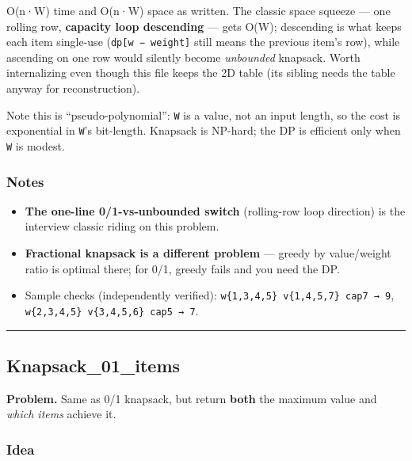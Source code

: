 \documentclass[
  10pt,
  letterpaper,
  onecolumn]{article}
\providecommand{\tightlist}{%
  \setlength{\itemsep}{0pt}\setlength{\parskip}{0pt}}
\begin{document}
O(n·W) time and O(n·W) space as written. The classic space squeeze ---
one rolling row, \textbf{capacity loop descending} --- gets O(W);
descending is what keeps each item single-use
(\texttt{dp{[}w\ −\ weight{]}} still means the previous item's row),
while ascending on one row would silently become \emph{unbounded}
knapsack. Worth internalizing even though this file keeps the 2D table
(its sibling needs the table anyway for reconstruction).

Note this is ``pseudo-polynomial'': \texttt{W} is a value, not an input
length, so the cost is exponential in \texttt{W}'s bit-length. Knapsack
is NP-hard; the DP is efficient only when \texttt{W} is modest.

\hypertarget{notes-12}{%
\subsubsection{Notes}\label{notes-12}}

\begin{itemize}
\tightlist
\item
  \textbf{The one-line 0/1-vs-unbounded switch} (rolling-row loop
  direction) is the interview classic riding on this problem.
\item
  \textbf{Fractional knapsack is a different problem} --- greedy by
  value/weight ratio is optimal there; for 0/1, greedy fails and you
  need the DP.
\item
  Sample checks (independently verified):
  \texttt{w\{1,3,4,5\}\ v\{1,4,5,7\}\ cap7\ →\ 9},
  \texttt{w\{2,3,4,5\}\ v\{3,4,5,6\}\ cap5\ →\ 7}.
\end{itemize}

\begin{center}\rule{0.5\linewidth}{0.5pt}\end{center}

\hypertarget{knapsack_01_items}{%
\subsection{Knapsack\_01\_items}\label{knapsack_01_items}}

\textbf{Problem.} Same as 0/1 knapsack, but return \textbf{both} the
maximum value and \emph{which items} achieve it.

\hypertarget{idea-15}{%
\subsubsection{Idea}\label{idea-15}}
\end{document}
